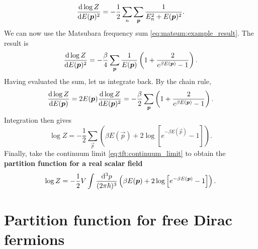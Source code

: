 \begin{equation}
	\odv{\log Z}{E(\vec{p})^2} = -\frac12 \sum_n \sum_\vec{p} \frac{1}{E_n^2 + E(\vec{p})^2} .
\label{eq:tft:matsubara_sum_bosons}
\end{equation}
We can now use the Matsubara frequency sum \eqref{eq:matsum:example_result}.
The result is
\begin{equation}
	\odv{\log Z}{E(\vec{p})^2} = -\frac{\beta}{4} \sum_\vec{p} \frac{1}{E(\vec{p})} \left( 1 + \frac{2}{e^{\beta E(\vec{p})} - 1} \right) .
\end{equation}
Having evaluated the sum, let us integrate back.
By the chain rule,
\begin{equation}
	\odv{\log Z}{E(\vec{p})} = 
	2 E(\vec{p}) \odv{\log Z}{E(\vec{p})^2} = 
	-\frac{\beta}{2} \sum_{\vec{p}} \left( 1 + \frac{2}{e^{\beta E(\vec{p})} - 1} \right) .
\end{equation}
Integration then gives
\TODO{parentheses order, whole document, $\{ [ ($ !}
\begin{equation}
	\log Z = -\frac{1}{2} \sum_\vec{p} \left( \beta E(\vec{p}) + 2 \log \left[ e^{-\beta E(\vec{p})} - 1 \right] \right) .
\end{equation}
Finally, take the continuum limit \eqref{eq:tft:continuum_limit} to obtain the \textbf{partition function for a real scalar field}
\begin{equation}
	\log Z = -\frac{1}{2} V \int \frac{\mathop{}\!\mathrm{d}^3 p}{(2 \pi \hbar)^3} \left( \beta E({\bm{p}}) + 2 \log \left[ e^{-\beta E({\bm{p}})} - 1 \right] \right) .
\end{equation}



\section{Partition function for free Dirac fermions}


